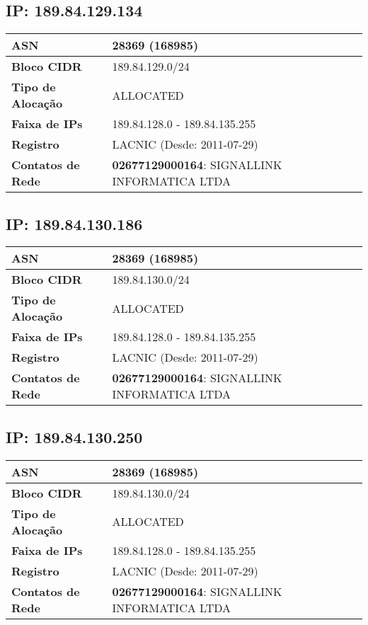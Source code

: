     \subsection{IP: 189.84.129.134}
    \begin{tabular}{|l|l|}
    \hline
    \textbf{ASN} & 28369 (168985) \\ \hline
    \textbf{Bloco CIDR} & 189.84.129.0/24 \\ \hline
    \textbf{Tipo de Alocação} & ALLOCATED \\ \hline
    \textbf{Faixa de IPs} & 189.84.128.0 - 189.84.135.255 \\ \hline
    \textbf{Registro} & LACNIC (Desde: 2011-07-29) \\ \hline
        
\textbf{Contatos de Rede} & \textbf{02677129000164}: SIGNALLINK INFORMATICA LTDA 
\\ \hline
\end{tabular}


    \subsection{IP: 189.84.130.186}
    \begin{tabular}{|l|l|}
    \hline
    \textbf{ASN} & 28369 (168985) \\ \hline
    \textbf{Bloco CIDR} & 189.84.130.0/24 \\ \hline
    \textbf{Tipo de Alocação} & ALLOCATED \\ \hline
    \textbf{Faixa de IPs} & 189.84.128.0 - 189.84.135.255 \\ \hline
    \textbf{Registro} & LACNIC (Desde: 2011-07-29) \\ \hline
        
\textbf{Contatos de Rede} & \textbf{02677129000164}: SIGNALLINK INFORMATICA LTDA 
\\ \hline
\end{tabular}


    \subsection{IP: 189.84.130.250}
    \begin{tabular}{|l|l|}
    \hline
    \textbf{ASN} & 28369 (168985) \\ \hline
    \textbf{Bloco CIDR} & 189.84.130.0/24 \\ \hline
    \textbf{Tipo de Alocação} & ALLOCATED \\ \hline
    \textbf{Faixa de IPs} & 189.84.128.0 - 189.84.135.255 \\ \hline
    \textbf{Registro} & LACNIC (Desde: 2011-07-29) \\ \hline
        
\textbf{Contatos de Rede} & \textbf{02677129000164}: SIGNALLINK INFORMATICA LTDA 
\\ \hline
\end{tabular}


